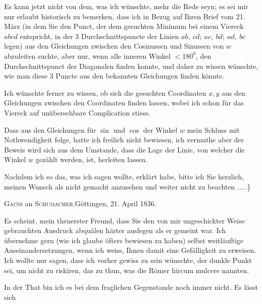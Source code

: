 \indent Es kann jetzt nicht von dem, was ich wünschte, mehr die Rede seyn; es sei mir nur erlaubt historisch zu bemerken, dass ich in Bezug auf Ihren Brief vom 21. März (in dem Sie den Punct, der dem gesuchten Minimum bei einem Viereck \(abcd\) entspricht, in  der 3 Durchschnittspuncte der Linien \(ab,\ cd;\ ac,\ bd;\ ad,\ bc\) legen)  aus den Gleichungen zwischen den Cosinussen und Sinussen von \(w\) abzuleiten suchte, aber nur, wenn alle inneren Winkel \(<180^{0}\), den Durchschnittspunct der Diagonalen finden konnte, und daher zu wissen wünschte, wie man diese 3 Puncte  aus den bekannten Gleichungen finden könnte.

\indent Ich wünschte ferner zu wissen, ob sich die gesuchten Coordinaten \(x,y\) aus den Gleichungen zwischen den Coordinaten finden lassen, wobei ich schon für das Viereck auf unübersehbare Complication stiess.

\indent Dass aus den Gleichungen für \(\sin\) und \(\cos\) der Winkel \(w\) mein Schluss mit Nothwendigkeit folge, hatte ich freilich nicht bewiesen, ich vermuthe aber
\clearpage{}
\noindent der Beweis wird sich aus dem Umstande, dass die Lage der Linie, von welcher die Winkel \(w\) gezählt werden,  ist, herleiten lassen.

\indent Nachdem ich so das, was ich sagen wollte, erklärt habe, bitte ich Sie herzlich, meinen Wunsch als nicht gemacht anzusehen und weiter nicht zu beachten .\enspace.\enspace.\enspace.\enspace.\}

\begin{center}\textsc{Gauss} an \textsc{Schumacher}.\quad Göttingen, 21. April 1836.\end{center}
\indent Es scheint, mein theuerster Freund, dass Sie den von mir ungeschickter Weise gebrauchten Ausdruck abquälen härter auslegen als er gemeint war. Ich übernehme gern (wie ich glaube öfters bewiesen zu haben) selbst weitläuftige Auseinandersetzungen, wenn ich weiss, Ihnen damit eine Gefälligkeit zu erweisen. Ich wollte nur sagen, dass ich vorher gewiss zu sein wünschte,  der dunkle Punkt sei, um nicht zu riskiren, das zu thun, was die Römer hircum mulcere nannten.

\indent In der That bin ich es bei dem fraglichen Gegenstande noch immer nicht. Es lässt sich

